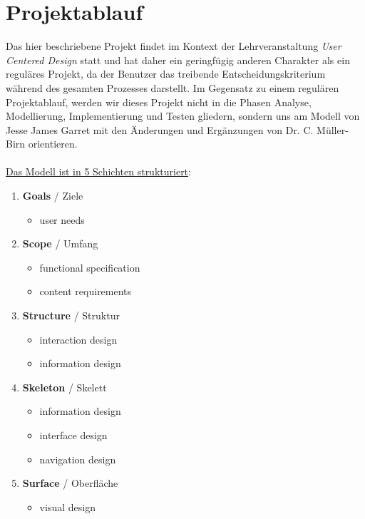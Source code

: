 \documentclass{article}
\begin{document}
\newpage

\section{Projektablauf}

Das hier beschriebene Projekt findet im Kontext der Lehrveranstaltung \textit{User Centered Design} statt und hat daher ein geringfügig anderen Charakter als ein reguläres Projekt, da der Benutzer das treibende Entscheidungskriterium während des gesamten Prozesses darstellt. Im Gegensatz zu einem regulären Projektablauf, werden wir dieses Projekt nicht in die Phasen Analyse, Modellierung, Implementierung und Testen gliedern, sondern uns am Modell von Jesse James Garret mit den Änderungen und Ergänzungen von Dr. C. Müller-Birn orientieren.\\
\\
\underline{Das Modell ist in 5 Schichten strukturiert}:
\begin{enumerate}
\item \textbf{Goals} / Ziele
	\begin{itemize}
	\item user needs
	\end{itemize}
\item \textbf{Scope} / Umfang
	\begin{itemize}
	\item functional specification
	\item content requirements
	\end{itemize}
\item \textbf{Structure} / Struktur
	\begin{itemize}
	\item interaction design
	\item information design
	\end{itemize}
\item \textbf{Skeleton} / Skelett
	\begin{itemize}
	\item information design
	\item interface design
	\item navigation design
	\end{itemize}
\item \textbf{Surface} / Oberfläche
	\begin{itemize}
	\item visual design
	\end{itemize}
\end{enumerate}
\end{document}
